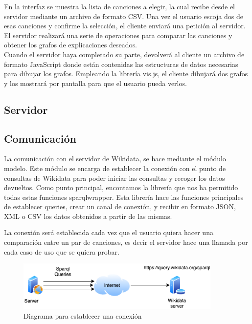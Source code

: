 En la interfaz se muestra la lista de canciones a elegir, la cual recibe desde el servidor mediante un archivo de formato CSV. Una vez el usuario escoja dos de esas canciones y confirme la selección, el cliente enviará una petición al servidor. El servidor realizará una serie de operaciones para comparar las canciones y obtener los grafos de explicaciones deseados.\\

Cuando el servidor haya completado su parte, devolverá al cliente un archivo de formato JavaScript donde están contenidas las estructuras de datos necesarias para dibujar los grafos. Empleando la librería vis.js, el cliente dibujará dos grafos y los mostrará por pantalla para que el usuario pueda verlos.\\

\subsection{Servidor}


\subsection{Comunicación}
La comunicación con el servidor de Wikidata, se hace mediante el módulo modelo. Este módulo se encarga de establecer la conexión con el punto de consultas de Wikidata para poder iniciar las consultas y recoger los datos devueltos. Como punto principal, encontamos la librería que nos ha permitido todas estas funciones sparqlwrapper. Esta librería hace las funciones principales de establecer queries, crear un canal de conexión, y recibir en formato JSON, XML o CSV los datos obtenidos a partir de las mismas. 

La conexión será establecida cada vez que el usuario quiera hacer una comparación entre un par de canciones, es decir el servidor hace una llamada por cada caso de uso que se quiera probar.

\begin{figure}[h!]
	\centering
	\includegraphics[width = 0.9\textwidth]{Imagenes/Bitmap/conexion.png}
	\caption{Diagrama para establecer una conexión}
	\label{fig:diagramaCS}
\end{figure}

